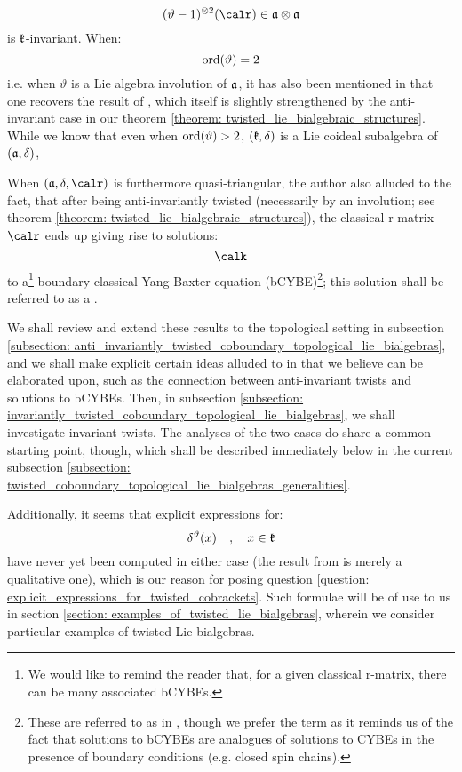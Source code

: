             $$(\vartheta - 1)^{\tensor 2}(\calr) \in \a \tensor \a$$
        is $\mathfrak{k}$-invariant. When:
            $$\operatorname{ord}(\vartheta) = 2$$
        i.e. when $\vartheta$ is a Lie algebra involution of $\mathfrak{a}$, it has also been mentioned in \cite{schrader_integrable_systems_from_classical_reflection_equations} that one recovers the result of \cite{belliard_crampe_coideal_subalgebras_from_twisted_manin_triples}, which itself is slightly strengthened by the anti-invariant case in our theorem \ref{theorem: twisted_lie_bialgebraic_structures}. While we know that even when $\operatorname{ord}(\vartheta) > 2$, $(\mathfrak{k}, \delta)$ is a Lie coideal subalgebra of $(\mathfrak{a}, \delta)$, 
        
        When $(\a, \delta, \calr)$ is furthermore quasi-triangular, the author also alluded to the fact, that after being anti-invariantly twisted (necessarily by an involution; see theorem \ref{theorem: twisted_lie_bialgebraic_structures}), the classical r-matrix $\calr$ ends up giving rise to solutions:
            $$\calk$$
        to a\footnote{We would like to remind the reader that, for a given classical r-matrix, there can be many associated bCYBEs.} boundary classical Yang-Baxter equation (bCYBE)\footnote{These are referred to as  in \cite{schrader_integrable_systems_from_classical_reflection_equations}, though we prefer the term  as it reminds us of the fact that solutions to bCYBEs are analogues of solutions to CYBEs in the presence of boundary conditions (e.g. closed spin chains).}; this solution shall be referred to as a .
        
        We shall review and extend these results to the topological setting in subsection \ref{subsection: anti_invariantly_twisted_coboundary_topological_lie_bialgebras}, and we shall make explicit certain ideas alluded to in \cite{schrader_integrable_systems_from_classical_reflection_equations} that we believe can be elaborated upon, such as the connection between anti-invariant twists and solutions to bCYBEs. Then, in subsection \ref{subsection: invariantly_twisted_coboundary_topological_lie_bialgebras}, we shall investigate invariant twists. The analyses of the two cases do share a common starting point, though, which shall be described immediately below in the current subsection \ref{subsection: twisted_coboundary_topological_lie_bialgebras_generalities}.

        Additionally, it seems that explicit expressions for:
            $$\delta^{\vartheta}(x) \quad, \quad x \in \mathfrak{k}$$
        have never yet been computed in either case (the result from \cite{schrader_integrable_systems_from_classical_reflection_equations} is merely a qualitative one), which is our reason for posing question \ref{question: explicit_expressions_for_twisted_cobrackets}. Such formulae will be of use to us in section \ref{section: examples_of_twisted_lie_bialgebras}, wherein we consider particular examples of twisted Lie bialgebras.

